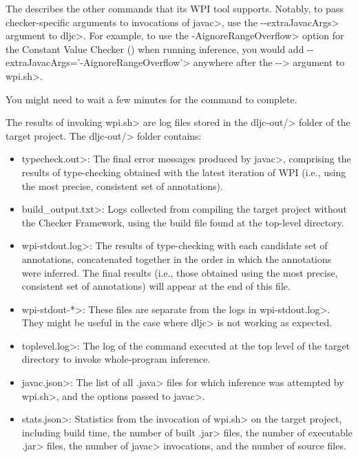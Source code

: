 \begin{description}
  The 
  describes the other commands that its WPI tool supports. Notably, to pass checker-specific
  arguments to invocations of \<javac>,
  use the \<-\relax-extraJavacArgs> argument to \<dljc>. For example, to use the \<-AignoreRangeOverflow>
  option for the Constant Value Checker () when running
  inference, you would add \<-\relax-extraJavacArgs='-AignoreRangeOverflow'> anywhere after the \<-\relax->
  argument to \<wpi.sh>.
\end{description}

You might need to wait a few minutes for the command to complete.


The results of invoking \<wpi.sh> are log files stored in the \<dljc-out/> folder
of the target project.
The \<dljc-out/> folder contains:

\begin{itemize}
\item \<typecheck.out>: The final error messages produced by \<javac>,
  comprising the results of type-checking obtained with the
  latest iteration of WPI (i.e., using the most precise, consistent set of
  annotations).
\item \<build\_output.txt>: Logs collected from compiling the target project
  without the Checker Framework, using the build file found at the
  top-level directory.
\item \<wpi-stdout.log>: The results of type-checking with each candidate set of
  annotations, concatenated together in the order in which the annotations
  were inferred.
  The final results (i.e., those obtained using the most precise, consistent
  set of annotations) will appear at the end of this file.
\item \<wpi-stdout-*>: These files are separate from the logs in \<wpi-stdout.log>.
  They might be useful in the case where \<dljc> is not working as expected.
\item \<toplevel.log>: The log of the command executed at the top level of the
  target directory to invoke whole-program inference.
\item \<javac.json>: The list of all \<.java> files for which inference was
  attempted by \<wpi.sh>, and the options passed to \<javac>.
\item \<stats.json>: Statistics from the invocation of \<wpi.sh> on the target
  project, including build time, the number of built \<.jar> files, the number of
  executable \<.jar> files, the number of \<javac> invocations, and the number of
  source files.
\end{itemize}


